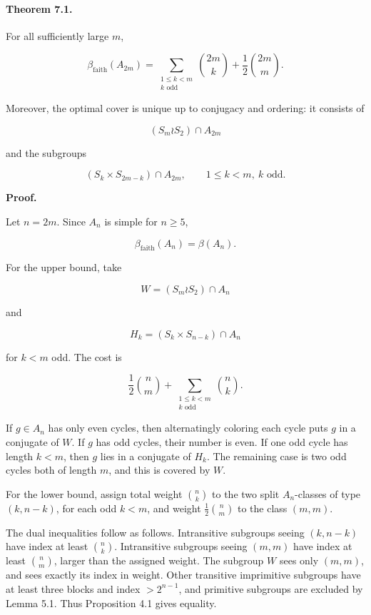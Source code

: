 \documentclass[11pt]{article}
\begin{document}
\paragraph{Theorem 7.1.}

For all sufficiently large $m$,

\[
\beta_{\mathrm{faith}}(A_{2m})
=
\sum_{\substack{1\le k<m\\ k\text{ odd}}}\binom{2m}{k}
+
\frac12\binom{2m}{m}.
\]

Moreover, the optimal cover is unique up to conjugacy and ordering: it consists of

\[
(S_m\wr S_2)\cap A_{2m}
\]

and the subgroups

\[
(S_k\times S_{2m-k})\cap A_{2m},
\qquad
1\le k<m,\ k\text{ odd}.
\]

\noindent\textbf{Proof.}

Let $n=2m$. Since $A_n$ is simple for $n\ge5$,

\[
\beta_{\mathrm{faith}}(A_n)=\beta(A_n).
\]

For the upper bound, take

\[
W=(S_m\wr S_2)\cap A_n
\]

and

\[
H_k=(S_k\times S_{n-k})\cap A_n
\]

for $k<m$ odd. The cost is

\[
\frac12\binom nm
+
\sum_{\substack{1\le k<m\\ k\text{ odd}}}\binom nk.
\]

If $g\in A_n$ has only even cycles, then alternatingly coloring each cycle puts $g$ in a conjugate of $W$. If $g$ has odd cycles, their number is even. If one odd cycle has length $k<m$, then $g$ lies in a conjugate of $H_k$. The remaining case is two odd cycles both of length $m$, and this is covered by $W$.

For the lower bound, assign total weight $\binom nk$ to the two split $A_n$-classes of type $(k,n-k)$, for each odd $k<m$, and weight $\frac12\binom nm$ to the class $(m,m)$.

The dual inequalities follow as follows. Intransitive subgroups seeing $(k,n-k)$ have index at least $\binom nk$. Intransitive subgroups seeing $(m,m)$ have index at least $\binom nm$, larger than the assigned weight. The subgroup $W$ sees only $(m,m)$, and sees exactly its index in weight. Other transitive imprimitive subgroups have at least three blocks and index $>2^{n-1}$, and primitive subgroups are excluded by Lemma 5.1. Thus Proposition 4.1 gives equality.
\end{document}
